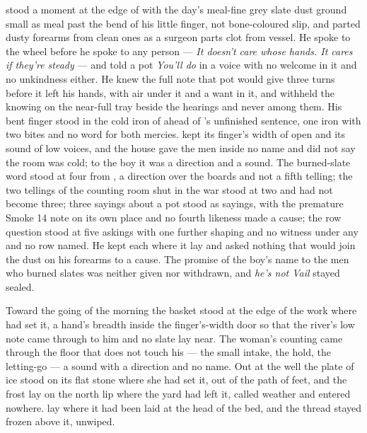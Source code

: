  stood a moment at the edge of  with the day's meal-fine grey slate dust ground small as meal past the bend of his little finger, not bone-coloured slip, and parted dusty forearms from clean ones as a surgeon parts clot from vessel. He spoke to the wheel before he spoke to any person --- \emph{It doesn't care whose hands. It cares if they're steady} --- and told a pot \emph{You'll do} in a voice with no welcome in it and no unkindness either. He knew the full note that pot would give three turns before it left his hands, with air under it and a want in it, and withheld the knowing on the near-full tray beside the hearings and never among them. His bent finger stood in the cold iron of  ahead of 's unfinished sentence, one iron with two bites and no  word for both mercies.  kept its finger's width of open and its sound of low voices, and the house gave the men inside no name and did not say the room was cold; to the boy it was a direction and a sound. The burned-slate word stood at four from , a direction over the boards and not a fifth telling; the two tellings of the counting room shut in the war stood at two and had not become three; three sayings about a pot stood as sayings, with the premature Smoke 14 note on its own place and no fourth likeness made a cause; the row question stood at five askings with one further shaping and no witness under any and no row named. He kept each where it lay and asked nothing that would join the dust on his forearms to a cause. The promise of the boy's name to the men who burned slates was neither given nor withdrawn, and \emph{he's not Vail} stayed sealed.

\scenebreak

Toward the going of the morning the basket stood at the edge of the work where  had set it, a hand's breadth inside the finger's-width door so that the river's low note came through to him and no slate lay near. The woman's counting came through the floor that does not touch his --- the small intake, the hold, the letting-go --- a sound with a direction and no name. Out at the well the plate of ice stood on its flat stone where she had set it, out of the path of feet, and the frost lay on the north lip where the yard had left it, called weather and entered nowhere.  lay where it had been laid at the head of the bed, and the thread stayed frozen above it, unwiped.

